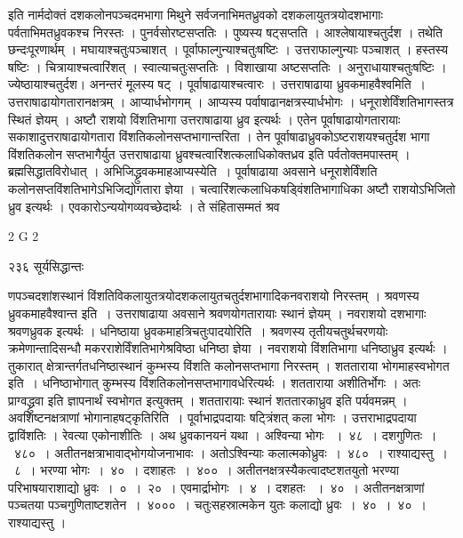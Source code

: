 \documentclass[11pt, openany]{book}
\begin{document}
\noindent इति नार्मदोक्तं दशकलोनपञ्चदमभागा मिथुने सर्वजनाभिमतध्रुवको दशकलायुतत्रयोदशभागाः पर्वताभिमतध्रुवकश्च निरस्तः । पुनर्वसोरष्टसप्ततिः । पुष्यस्य षट्सप्तति । आश्लेषायाश्चतुर्दश । तथेति छन्दःपूरणार्थम् । मघायाश्चतुःपञ्चाशत् । पूर्वाफाल्गुन्याश्चतुःषष्टिः । उत्तराफाल्गुन्याः पञ्चाशत् । हस्तस्य षष्टिः । चित्रायाश्चत्वारिंशत् । स्वात्याचतुःसप्ततिः । विशाखाया अष्टसप्ततिः । अनुराधायाश्चतुःषष्टिः । ज्येष्ठायाश्चतुर्दश। अनन्तरं मूलस्य षट् । पूर्वाषाढायाश्चत्वारः । उत्तराषाढाया ध्रुवकमाह\textendash  वैश्वमिति~। उत्तराषाढायोगतारानक्षत्रम् । आप्यार्धभोगगम् । आप्यस्य पर्वाषाढानक्षत्रस्यार्धभोगः । धनूराशेर्विंशतिभागस्तत्र स्थितं ज्ञेयम् । अष्टौ राशयो विंशतिभागा उत्तराषाढाया ध्रुव इत्यर्थः । एतेन पूर्वाषाढायोगतारायाः सकाशादुत्तराषाढायोगतारा विंशतिकलोनसप्तभागान्तरिता । तेन पूर्वाषाढाध्रुवकोऽष्टराशयश्चतुर्दश भागा विंशतिकलोन सप्तभागैर्युत उत्तराषाढाया ध्रुवश्चत्वारिंशत्कलाधिकोक्तध्रव इति पर्वतोक्तमपास्तम् । ब्रह्मसिद्धातविरोधात् । अभिजिद्ध्रुवकमाह\textendash आप्यस्येति~। पूर्वाषाढाया अवसाने धनूराशेर्विंशति कलोनसप्तविंशतिभागेऽभिजिद्योगतारा ज्ञेया । चत्वारिंशत्कलाधिकषड्विंशतिभागाधिका अष्टौ राशयोऽभिजितो ध्रुव इत्यर्थः । एवकारोऽन्ययोगव्यवच्छेदार्थः । ते संहितासम्मतं श्रव \textendash


{\tiny{2 G 2}}

\newpage

\noindent २३६ \hspace{4cm} सूर्यसिद्धान्तः 
\vspace{1cm}


\noindent णपञ्चदशांशस्थानं विंशतिविकलायुतत्रयोदशकलायुतचतुर्दशभागादिकनवराशयो निरस्तम् । श्रवणस्य ध्रुवकमाह\textendash वैश्वान्त इति~। उत्तराषाढाया अवसाने श्रवणयोगतारायाः स्थानं ज्ञेयम् । नवराशयो दशभागाः श्रवणध्रुवक इत्यर्थः । धनिष्ठाया ध्रुवकमाह\textendash त्रिचतुःपादयोरिति~। श्रवणस्य तृतीयचतुर्थचरणयोः क्रमेणान्तादिसन्धौ मकरराशेर्विंशतिभागेश्रविष्ठा धनिष्ठा ज्ञेया । नवराशयो विंशतिभागा धनिष्ठाध्रुव इत्यर्थः । तुकारात् क्षेत्रान्तर्गतधनिष्ठास्थानं कुम्भस्य विंशति कलोनसप्तभागा निरस्तम् । शतताराया भोगमाह\textendash स्वभोगत इति~। धनिष्ठाभोगात् कुम्भस्य विंशतिकलोनसप्तभागावधेरित्यर्थः । शतताराया अशीतिर्भोगः । अतः प्राग्वद्ध्रुवा इति ज्ञापनार्थं स्वभोगत इत्युक्तम् । शततारायाः स्थानं शततारकाध्रुव इति पर्यवमन्नम् । अवशिष्टनक्षत्राणां भोगानाह\textendash षट्कृतिरिति~। पूर्वाभाद्रपदायाः षट्त्रिंशत् कला भोगः । उत्तराभाद्रपदाया द्वाविंशतिः । रेवत्या एकोनाशीतिः । अथ ध्रुवकानयनं यथा । अश्विन्या भोगः ~।~४८~। दशगुणितः~।~४८०~। अतीतनक्षत्राभावाद्भोगयोजनाभावः । अतोऽश्विन्याः कलात्मकोध्रुवः~।~४८०~। राश्याद्यस्तु~।~८~। भरण्या भोगः~।~४०~। दशाहतः~।~४००~। अतीतनक्षत्रस्यैकत्वादष्टशतयुतो भरण्या परिभाषयाराशाद्यो ध्रुवः~।~०~।~२०~। एवमार्द्राभोगः~।~४~। दशहतः ~।~४०~। अतीतनक्षत्राणां पञ्चतया पञ्चगुणिताष्टशतेन~।~४०००~। चतुःसहस्रात्मकेन युतः कलाद्यो ध्रुवः~।~४०~।~४०~। राश्याद्यस्तु । 
\end{document}
